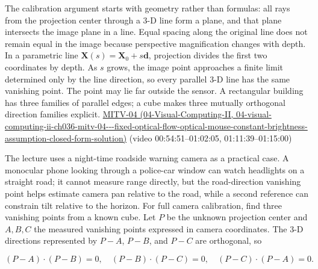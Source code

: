 The calibration argument starts with geometry rather than formulas: all rays from the projection center through a 3-D line form a plane, and that plane intersects the image plane in a line. Equal spacing along the original line does not remain equal in the image because perspective magnification changes with depth. In a parametric line \(\mathbf{X}(s)=\mathbf{X}_0+s\mathbf{d}\), projection divides the first two coordinates by depth. As \(s\) grows, the image point approaches a finite limit determined only by the line direction, so every parallel 3-D line has the same vanishing point. The point may lie far outside the sensor. A rectangular building has three families of parallel edges; a cube makes three mutually orthogonal direction families explicit. \href{../04-Visual-Computing-II/main.pdf\#nameddest=04-visual-computing-ii-ch036-mitv-04---fixed-optical-flow-optical-mouse-constant-brightness-assumption-closed-form-solution}{MITV-04 (04-Visual-Computing-II, 04-visual-computing-ii-ch036-mitv-04-\/-\/-fixed-optical-flow-optical-mouse-constant-brightness-assumption-closed-form-solution)} (video 00:54:51--01:02:05, 01:11:39--01:15:00)

The lecture uses a night-time roadside warning camera as a practical case. A monocular phone looking through a police-car window can watch headlights on a straight road; it cannot measure range directly, but the road-direction vanishing point helps estimate camera pan relative to the road, while a second reference can constrain tilt relative to the horizon. For full camera calibration, find three vanishing points from a known cube. Let \(P\) be the unknown projection center and \(A,B,C\) the measured vanishing points expressed in camera coordinates. The 3-D directions represented by \(P-A\), \(P-B\), and \(P-C\) are orthogonal, so

\[
(P-A)\cdot(P-B)=0,\quad (P-B)\cdot(P-C)=0,\quad (P-C)\cdot(P-A)=0.
\]

